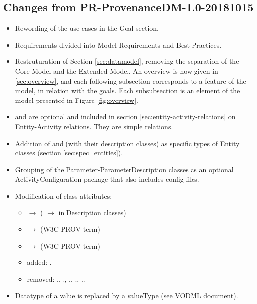 
\subsection{Changes from PR-ProvenanceDM-1.0-20181015}

\begin{itemize}
\item Rewording of the use cases in the Goal section.
\item Requirements divided into Model Requirements and Best Practices.
\item Restruturation of Section \ref{sec:datamodel}, removing the separation of the Core Model and the Extended Model. An overview is now given in \ref{sec:overview}, and each following subsection corresponds to a feature of the model, in relation with the goals. Each subsubsection is an element of the model presented in Figure \ref{fig:overview}.
\item {} and  are optional and included in section \ref{sec:entity-activity-relations} on Entity-Activity relations. They are simple relations.
\item Addition of  and  (with their description classes) as specific types of Entity classes (section \ref{sec:spec_entities}).
\item Grouping of the Parameter-ParameterDescription classes as an optional ActivityConfiguration package that also includes config files.
\item Modification of class attributes: 
\begin{itemize}
  \item {} $\rightarrow$  ( $\rightarrow$  in Description classes)
  \item {} $\rightarrow$  (W3C PROV term)
  \item {} $\rightarrow$  (W3C PROV term)
  \item added: .
  \item removed: ., ., ., ., ..
\end{itemize}
\item Datatype of a value is replaced by a valueType (see VODML document).

\end{itemize}

